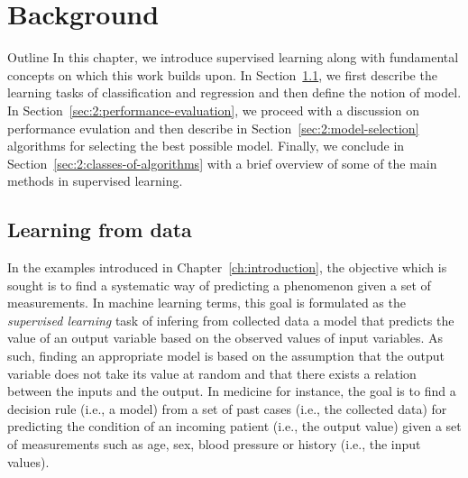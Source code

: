 \chapter{Background}\label{ch:background}

\begin{remark}{Outline}
In this chapter, we introduce supervised learning along with fundamental
concepts on which this work builds upon. In Section~\ref{sec:2:learning-from-data},
we first describe the learning tasks of classification and regression
and then define the notion of model. In Section~\ref{sec:2:performance-evaluation}, we proceed with a discussion on performance evulation and then describe in Section~\ref{sec:2:model-selection} algorithms for selecting the best possible model.  Finally,
we conclude in Section~\ref{sec:2:classes-of-algorithms} with a brief overview of
some of the main methods in supervised learning.
\end{remark}

\section{Learning from data}
\label{sec:2:learning-from-data}

In the examples introduced in Chapter~\ref{ch:introduction}, the objective
which is sought is to find a systematic way of predicting a phenomenon given a
set of measurements. In machine learning terms, this goal is formulated as the
{\it supervised learning} task of infering from collected data a model that
predicts the value of an output variable based on the observed values of input
variables. As such, finding an appropriate model is based on the assumption
that the output variable does not take its value at random and that there
exists a relation between the inputs and the output. In medicine for instance,
the goal is to find a decision rule (i.e., a model) from a set of past cases
(i.e., the collected data) for predicting the condition of an incoming patient
(i.e., the output value) given a set of measurements such as age, sex, blood
pressure or history (i.e., the input values).

